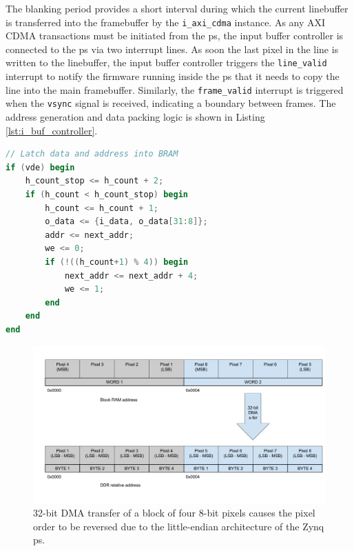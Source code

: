 The blanking period provides a short interval during which the current linebuffer is transferred into the framebuffer by the \texttt{i\_axi\_cdma} instance. As any AXI CDMA transactions must be initiated from the \gls{ps}, the input buffer controller is connected to the \gls{ps} via two interrupt lines. As soon the last pixel in the line is written to the linebuffer, the input buffer controller triggers the \texttt{line\_valid} interrupt to notify the firmware running inside the \gls{ps} that it needs to copy the line into the main framebuffer. Similarly, the \texttt{frame\_valid} interrupt is triggered when the \texttt{vsync} signal is received, indicating a boundary between frames. The address generation and data packing logic is shown in Listing \ref{lst:i_buf_controller}.

\begin{lstlisting}[caption={Address generation and data packing logic for input framebuffer.}, label={lst:i_buf_controller}, language=Verilog]
// Latch data and address into BRAM
if (vde) begin
    h_count_stop <= h_count + 2;
    if (h_count < h_count_stop) begin
        h_count <= h_count + 1;
        o_data <= {i_data, o_data[31:8]};
        addr <= next_addr;
        we <= 0;
        if (!((h_count+1) % 4)) begin
            next_addr <= next_addr + 4;
            we <= 1;
        end
    end
end
\end{lstlisting}

\begin{figure}
  \centering
  \includegraphics[width=1\textwidth]{./img/dma_endianness.png}
  \caption[DMA transfer byte reversal.]{32-bit DMA transfer of a block of four 8-bit pixels causes the pixel order to be reversed due to the little-endian architecture of the Zynq \gls{ps}.}
  \label{fig:dma_endianness}
\end{figure}


